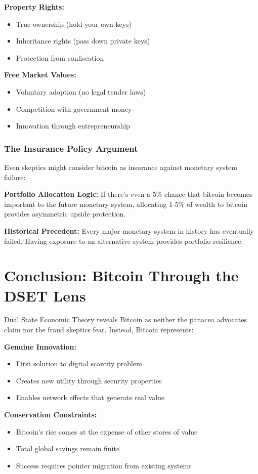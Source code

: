 \documentclass[11pt,oneside]{book}
\begin{document}
\textbf{Property Rights:}
\begin{itemize}
\item True ownership (hold your own keys)
\item Inheritance rights (pass down private keys)
\item Protection from confiscation
\end{itemize}

\textbf{Free Market Values:}
\begin{itemize}
\item Voluntary adoption (no legal tender laws)
\item Competition with government money
\item Innovation through entrepreneurship
\end{itemize}

\subsubsection{The Insurance Policy Argument}

Even skeptics might consider bitcoin as insurance against monetary system failure:

\textbf{Portfolio Allocation Logic:}
If there's even a 5\% chance that bitcoin becomes important to the future monetary system, allocating 1-5\% of wealth to bitcoin provides asymmetric upside protection.

\textbf{Historical Precedent:}
Every major monetary system in history has eventually failed. Having exposure to an alternative system provides portfolio resilience.

\section{Conclusion: Bitcoin Through the DSET Lens}

Dual State Economic Theory reveals Bitcoin as neither the panacea advocates claim nor the fraud skeptics fear. Instead, Bitcoin represents:

\textbf{Genuine Innovation:}
\begin{itemize}
\item First solution to digital scarcity problem
\item Creates new utility through security properties
\item Enables network effects that generate real value
\end{itemize}

\textbf{Conservation Constraints:}
\begin{itemize}
\item Bitcoin's rise comes at the expense of other stores of value
\item Total global savings remain finite
\item Success requires pointer migration from existing systems
\end{itemize}
\end{document}
